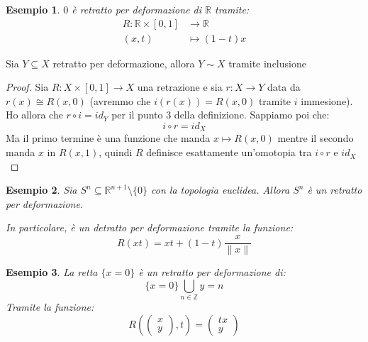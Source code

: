 \documentclass[11pt,a4paper,twoside]{article}
\newtheorem{es}{Esempio}
\theoremstyle{definition}
\begin{document}
\begin{es}
	$0$ è retratto per deformazione di $\mathbb R$ tramite:
	\begin{align*}
		R:\mathbb R \times [0,1] & \to \mathbb R\\
		(x, t) &\mapsto (1-t)x
	\end{align*}
\end{es}

\begin{prop}{}{}
	Sia $Y \subseteq X$ retratto per deformazione, allora $Y \sim X$ tramite inclusione
\end{prop}

\begin{proof}
	Sia $R: X \times [0,1] \to X$ una retrazione e sia $r:X \to Y$ data da $r(x)\cong R(x, 0)$ (avremmo che $i(r(x)) = R(x, 0)$ tramite $i$ immesione). Ho allora che $r \circ i = id_Y$ per il punto $3$ della definizione. Sappiamo poi che:
	\[ i \circ r = id_X \]
	Ma il primo termine è una funzione che manda $x \mapsto R(x,0)$ mentre il secondo manda $x$ in $R(x,1)$, quindi $R$ definisce esattamente un'omotopia tra $i\circ r$ e $id_X$
\end{proof}

\begin{es}
	Sia $S^n \subseteq \mathbb R^{n+1}\setminus \{0\}$ con la topologia euclidea. Allora $S^{n}$ è un retratto per deformazione.
	\begin{center}
	\end{center}
	In particolare, è un detratto per deformazione tramite la funzione:
	\[ R(xt) = xt + (1-t) \frac{x}{\|x\|} \]
\end{es}

\begin{es}
	La retta $\{x=0\}$ è un retratto per deformazione di:
	\[ \{x = 0\} \bigcup_{n \in \mathbb Z}{y = n} \]
	Tramite la funzione:
	\[ R\left(\begin{pmatrix}x\\ y\end{pmatrix}, t\right) = \begin{pmatrix} tx\\ y \end{pmatrix}\]

	\begin{center}
	\end{center}
\end{es}
\end{document}
